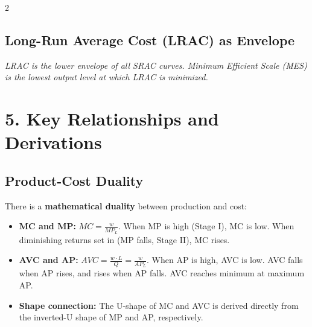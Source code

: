 \documentclass[10pt,a4paper]{article}
\begin{document}
\begin{multicols}{2}
\subsection*{Long-Run Average Cost (LRAC) as Envelope}
\begin{center}
\end{center}
\textit{LRAC is the lower envelope of all SRAC curves. Minimum Efficient Scale (MES) is the lowest output level at which LRAC is minimized.}

\columnbreak

\section*{5. Key Relationships and Derivations}

\subsection*{Product-Cost Duality}
There is a \textbf{mathematical duality} between production and cost:
\begin{itemize}[leftmargin=*,nosep]
    \item \textbf{MC and MP:} $MC = \frac{w}{MP_L}$. When MP is high (Stage I), MC is low. When diminishing returns set in (MP falls, Stage II), MC rises.
    \item \textbf{AVC and AP:} $AVC = \frac{w \cdot L}{Q} = \frac{w}{AP_L}$. When AP is high, AVC is low. AVC falls when AP rises, and rises when AP falls. AVC reaches minimum at maximum AP.
    \item \textbf{Shape connection:} The U-shape of MC and AVC is derived directly from the inverted-U shape of MP and AP, respectively.
\end{itemize}


\end{multicols}
\end{document}
